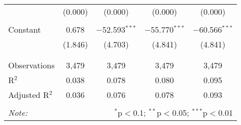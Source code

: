 \begin{table}[!htbp]
\begin{tabular}{@{\extracolsep{-5pt}}lcccc}
  & (0.000) & (0.000) & (0.000) & (0.000) \\ 
  & & & & \\ 
 Constant & 0.678 & $-$52.593$^{***}$ & $-$55.770$^{***}$ & $-$60.566$^{***}$ \\ 
  & (1.846) & (4.703) & (4.841) & (4.841) \\ 
  & & & & \\ 
\hline \\[-1.8ex] 
Observations & 3,479 & 3,479 & 3,479 & 3,479 \\ 
R$^{2}$ & 0.038 & 0.078 & 0.080 & 0.095 \\ 
Adjusted R$^{2}$ & 0.036 & 0.076 & 0.078 & 0.093 \\ 
\hline 
\hline \\[-1.8ex] 
\textit{Note:}  & \multicolumn{4}{r}{$^{*}$p$<$0.1; $^{**}$p$<$0.05; $^{***}$p$<$0.01} \\ 
\end{tabular} 
\end{table} 
